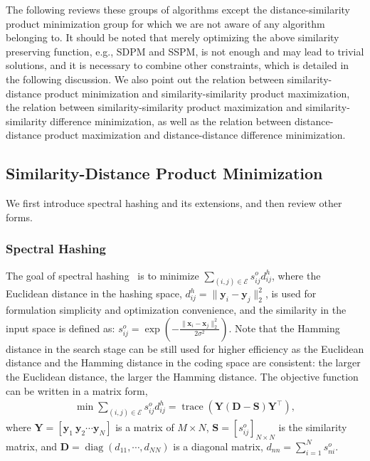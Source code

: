 \documentclass[10pt,journal,compsoc]{IEEEtran}
\begin{document}
The following reviews these groups of algorithms
except the distance-similarity product minimization group for
which we are not aware of any algorithm belonging to.
It should be noted that merely optimizing the above similarity preserving function,
e.g., SDPM and SSPM,
is not enough and may lead to trivial solutions,
and it is necessary to combine other constraints,
which is detailed in the following discussion.
We also point out the relation
between similarity-distance product minimization
and similarity-similarity product maximization,
the relation between similarity-similarity product maximization
and similarity-similarity difference minimization,
as well as
the relation between distance-distance product maximization
and distance-distance difference minimization.

\subsection{Similarity-Distance Product Minimization}
We first introduce spectral hashing and its extensions,
and then review other forms.
\subsubsection{Spectral Hashing}
The goal
of spectral hashing~\cite{WeissTF08} is to minimize $ \sum_{(i,j) \in \mathcal{E}} s_{ij}^o d_{ij}^h$,
where the Euclidean distance in the hashing space,
$d_{ij}^h = \|\mathbf{y}_i - \mathbf{y}_j\|_2^2$,
is used
for formulation simplicity and optimization convenience,
and the similarity in the input space is defined as:
$s_{ij}^o = \exp{(-\frac{\|\mathbf{x}_i - \mathbf{x}_j\|_2^2}{2\sigma^2})}$.
Note that the Hamming distance in the search stage
can be still used for higher efficiency
as the Euclidean distance and the Hamming distance
in the coding space are consistent:
the larger the Euclidean distance, the larger the Hamming distance.
The objective function can be written in a matrix form,
\begin{align}
\operatorname{min} \sum\nolimits_{(i,j) \in \mathcal{E}} s_{ij}^o d_{ij}^h
= \operatorname{trace}(\mathbf{Y}(\mathbf{D}-\mathbf{S})\mathbf{Y}^\top),
\label{eqn:spectralhashingobjectivefunction}
\end{align}
where $\mathbf{Y} = [\mathbf{y}_1~\mathbf{y}_2\cdots\mathbf{y}_N]$
is a matrix of $M \times N$,
$\mathbf{S} = [s^o_{ij}]_{N \times N}$ is the similarity matrix,
and $\mathbf{D} = \operatorname{diag}(d_{11}, \cdots, d_{NN})$
is a diagonal matrix,
$d_{nn} = \sum_{i=1}^N s^o_{ni}$.
\end{document}
